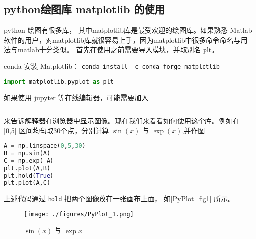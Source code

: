 
\subsection{python绘图库 matplotlib 的使用}

python 绘图有很多库， 其中matplotlib库是最受欢迎的绘图库。如果熟悉 Matlab 软件的用户，对matplotlib库就很容易上手，因为matplotlib中很多命令命名与用法与matlab十分类似。 首先在使用之前需要导入模块，并取别名 plt。

conda 安装 Matplotlib： \verb|conda install -c conda-forge matplotlib|

\begin{lstlisting}[language=python]
import matplotlib.pyplot as plt
\end{lstlisting}
如果使用 jupyter 等在线编辑器，可能需要加入
\begin{lstlisting}[language=python]
% matplotlib inline
\end{lstlisting}
来告诉解释器在浏览器中显示图像。现在我们来看看如何使用这个库。例如在 [0,5] 区间均匀取30个点，分别计算 $\sin(x)$ 与 $\exp(x)$,并作图
\begin{lstlisting}[language=python]
A = np.linspace(0,5,30) 
B = np.sin(A)
C = np.exp(-A)
plt.plot(A,B)
plt.hold(True)
plt.plot(A,C)
\end{lstlisting}
上述代码通过 \verb|hold| 把两个图像放在一张画布上面， 如\autoref{PyPlot_fig1} 所示。
\begin{figure}[ht]
\centering
\texttt{[image: ./figures/PyPlot\_1.png]}
\caption{$\sin(x)$ 与 $\exp{x}$} \label{PyPlot_fig1}
\end{figure}


